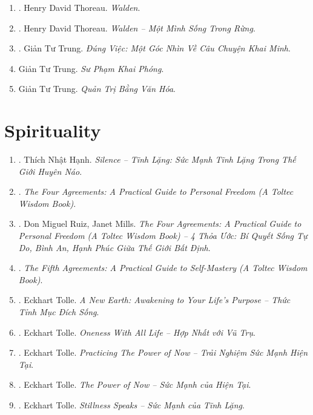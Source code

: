 \documentclass{article}
\begin{document}
\begin{enumerate}
	\item \cite{Thoreau2014}. Henry David Thoreau. {\it Walden}.\hfill{\sf[reading]}
	\item \cite{Thoreau2023}. Henry David Thoreau. {\it Walden -- Một Mình Sống Trong Rừng}.\hfill{\sf[done]}
	\item \cite{Trung_dung_viec}. Giản Tư Trung. {\it Đúng Việc: Một Góc Nhìn Về Câu Chuyện Khai Minh}.\hfill{\sf[done]}
	\item Giản Tư Trung. {\it Sư Phạm Khai Phóng}.
	\item Giản Tư Trung. {\it Quản Trị Bằng Văn Hóa}.
\end{enumerate}


\section{Spirituality}

\begin{enumerate}
	\item \cite{Hanh_silence}. Thích Nhật Hạnh. {\it Silence -- Tĩnh Lặng: Sức Mạnh Tĩnh Lặng Trong Thế Giới Huyên Náo}.\hfill{\sf[done]}
	\item \cite{Ruiz2011}. {\it The Four Agreements: A Practical Guide to Personal Freedom (A Toltec Wisdom Book)}.\hfill{\sf[done]}
	\item \cite{Ruiz_Mills2022}. Don Miguel Ruiz, Janet Mills. {\it The Four Agreements: A Practical Guide to Personal Freedom (A Toltec Wisdom Book) -- 4 Thỏa Ước: Bí Quyết Sống Tự Do, Bình An, Hạnh Phúc Giữa Thế Giới Bất Định}.\hfill{\sf[done]}
	\item \cite{Ruiz_Ruiz2011}. {\it The Fifth Agreements: A Practical Guide to Self-Mastery (A Toltec Wisdom Book)}.\hfill{\sf[done]}
	\item \cite{Tolle2021d}. Eckhart Tolle. {\it A New Earth: Awakening to Your Life's Purpose -- Thức Tỉnh Mục Đích Sống}.\hfill{\sf[done]}
	\item \cite{Tolle2021a}. Eckhart Tolle. {\it Oneness With All Life -- Hợp Nhất với Vũ Trụ}.\hfill{\sf[done]}
	\item \cite{Tolle2021b}. Eckhart Tolle. {\it Practicing The Power of Now -- Trải Nghiệm Sức Mạnh Hiện Tại}.\hfill{\sf[done]}
	\item \cite{Tolle2021c}. Eckhart Tolle. {\it The Power of Now -- Sức Mạnh của Hiện Tại}.\hfill{\sf[done]}
	\item \cite{Tolle2022}. Eckhart Tolle. {\it Stillness Speaks -- Sức Mạnh của Tĩnh Lặng}.\hfill{\sf[done]}
\end{enumerate}
\end{document}

